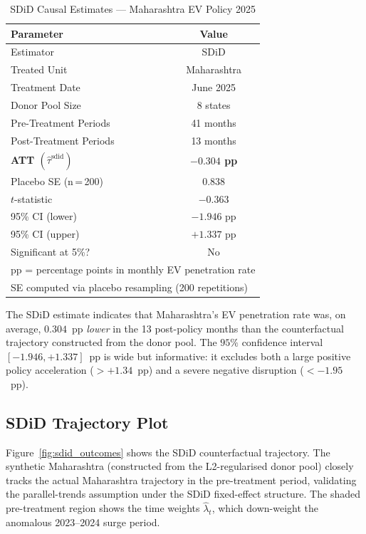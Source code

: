 \documentclass[journal]{IEEEtran}
\begin{document}
\begin{table}[H]
\centering
\caption{SDiD Causal Estimates — Maharashtra EV Policy 2025}
\label{tab:main_results}
\begin{tabular}{lc}
\toprule
\textbf{Parameter} & \textbf{Value} \\
\midrule
Estimator          & SDiD \citep{Arkhangelsky2021} \\
Treated Unit       & Maharashtra \\
Treatment Date     & June 2025 \\
Donor Pool Size    & 8 states \\
Pre-Treatment Periods   & 41 months \\
Post-Treatment Periods  & 13 months \\
\midrule
\textbf{ATT $(\hat{\tau}^{\mathrm{sdid}})$} & \textbf{$-0.304$ pp} \\
Placebo SE (n\,=\,200) & $0.838$ \\
$t$-statistic          & $-0.363$ \\
95\% CI (lower)        & $-1.946$ pp \\
95\% CI (upper)        & $+1.337$ pp \\
Significant at 5\%?    & No \\
\bottomrule
\multicolumn{2}{l}{\footnotesize pp = percentage points in monthly EV 
penetration rate}\\
\multicolumn{2}{l}{\footnotesize SE computed via placebo resampling 
(200 repetitions)}
\end{tabular}
\end{table}

The SDiD estimate indicates that Maharashtra's EV penetration rate was, on
average, $0.304$~pp \emph{lower} in the 13 post-policy months than the
counterfactual trajectory constructed from the donor pool. The $95\%$
confidence interval $[-1.946, +1.337]$~pp is wide but informative: it 
excludes both a large positive policy acceleration ($> +1.34$~pp) and a 
severe negative disruption ($< -1.95$~pp).

\subsection{SDiD Trajectory Plot}

Figure~\ref{fig:sdid_outcomes} shows the SDiD counterfactual trajectory.
The synthetic Maharashtra (constructed from the L2-regularised donor pool)
closely tracks the actual Maharashtra trajectory in the pre-treatment period,
validating the parallel-trends assumption under the SDiD fixed-effect 
structure. The shaded pre-treatment region shows the time weights 
$\hat{\lambda}_t$, which down-weight the anomalous 2023--2024 surge period.
\end{document}
